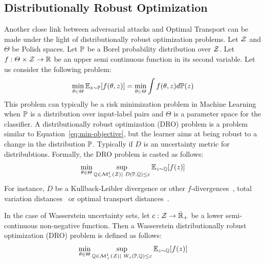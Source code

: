 \subsection{Distributionally Robust Optimization}

Another close link between adversarial attacks and Optimal Transport can be made under the light of distributionally robust optimization problems. Let $\mathcal{Z}$ and $\Theta$ be Polish spaces. Let $\mathbb{P}$ be a Borel probability distribution over $\mathcal{Z}$. Let $f:\Theta\times\mathcal{Z}\to\mathbb{R}$ be an upper semi continuous function in its second variable. Let us consider the following problem:
\begin{align}
    \label{eq:min-objective}
    \min_{\theta\in\Theta} \mathbb{E}_{z\sim\PP}\left[f(\theta,z)\right] = \min_{\theta\in\Theta} \int f(\theta,z)d\PP(z)
\end{align}
This problem can typically be a risk minimization problem in Machine Learning when $\mathbb{P}$ is a distribution over input-label pairs and $\Theta$ is a parameter space for the classifier. A distributionally robust optimization (DRO) problem is a problem similar to Equation~\eqref{eq:min-objective}, but the learner aims at being robust to a change in the distribution $\mathbb{P}$. Typically if $D$ is an uncertainty metric for distribubtions. Formally, the DRO problem is casted as follows:
\begin{align*}
    \min_{\theta\in\Theta}\sup_{\QQ\in\mathcal{M}^1_+(\ZZ)\mid~D(\PP,\QQ)\leq \varepsilon}\mathbb{E}_{z\sim\QQ}\left[f(z)\right]
\end{align*}
For instance, $D$ be a Kullback-Leibler divergence or other $f$-divergences~\citep{duchi2016statistics,namkoong2016stochastic}, total variation distances~\citep{jiang2018risk,rahimian2019identifying} or optimal transport distances~\citep{shafieezadeh2015distributionally,raghunathan2018certified,blanchet2019quantifying}.

In the case of Wasserstein uncertainty sets, let $c:\mathcal{Z}\to\bar{\mathbb{R}}_+$ be a lower semi-continuous non-negative function. Then a  Wasserstein distributionally robust optimization (DRO) problem is defined as follows:
\begin{align*}
    \min_{\theta\in\Theta}\sup_{\QQ\in\mathcal{M}^1_+(\ZZ)\mid~W_c(\PP,\QQ)\leq \varepsilon}\mathbb{E}_{z\sim\QQ}\left[f(z)\right]
\end{align*}

